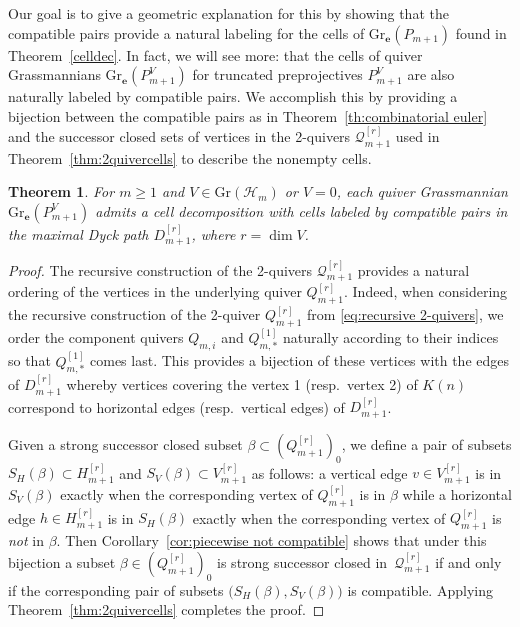 \documentclass{amsart}
\newtheorem{theorem}{Theorem}[section]
\numberwithin{equation}{section}
\newcommand{\bfe}{\mathbf{e}}
\newcommand{\cH}{\mathcal{H}}
\newcommand{\cQ}{\mathcal{Q}}
\newcommand{\Gr}{\mathrm{Gr}}
\begin{document}
Our goal is to give a geometric explanation for this by showing that the compatible pairs provide a natural labeling for the cells of $\Gr_\bfe(P_{m+1})$ found in Theorem~\ref{celldec}.
In fact, we will see more: that the cells of quiver Grassmannians $\Gr_\bfe(P_{m+1}^V)$ for truncated preprojectives $P_{m+1}^V$ are also naturally labeled by compatible pairs.
We accomplish this by providing a bijection between the compatible pairs as in Theorem~\ref{th:combinatorial euler} and the successor closed sets of vertices in the 2-quivers $\cQ_{m+1}^{[r]}$ used in Theorem~\ref{thm:2quivercells} to describe the nonempty cells.
\begin{theorem}
  \label{th:compatible cells}
  For $m\ge1$ and $V\in\Gr(\cH_m)$ or $V=0$, each quiver Grassmannian $\Gr_\bfe(P_{m+1}^V)$ admits a cell decomposition with cells labeled by compatible pairs in the maximal Dyck path $D_{m+1}^{[r]}$, where $r=\dim V$.
\end{theorem}
\begin{proof}
  The recursive construction of the 2-quivers $\cQ_{m+1}^{[r]}$ provides a natural ordering of the vertices in the underlying quiver $Q_{m+1}^{[r]}$.
  Indeed, when considering the recursive construction of the 2-quiver $Q_{m+1}^{[r]}$ from \eqref{eq:recursive 2-quivers}, we order the component quivers $Q_{m,i}$ and $Q_{m,*}^{[1]}$ naturally according to their indices so that $Q_{m,*}^{[1]}$ comes last.
  This provides a bijection of these vertices with the edges of $D_{m+1}^{[r]}$ whereby vertices covering the vertex 1 (resp.\ vertex 2) of $K(n)$ correspond to horizontal edges (resp.\ vertical edges) of $D_{m+1}^{[r]}$.

  Given a strong successor closed subset $\beta\subset(Q_{m+1}^{[r]})_0$, we define a pair of subsets $S_H(\beta)\subset H_{m+1}^{[r]}$ and $S_V(\beta)\subset V_{m+1}^{[r]}$ as follows: a vertical edge $v\in V_{m+1}^{[r]}$ is in $S_V(\beta)$ exactly when the corresponding vertex of $Q_{m+1}^{[r]}$ is in $\beta$ while a horizontal edge $h\in H_{m+1}^{[r]}$ is in $S_H(\beta)$ exactly when the corresponding vertex of $Q_{m+1}^{[r]}$ is \emph{not} in $\beta$.
  Then Corollary~\ref{cor:piecewise not compatible} shows that under this bijection a subset $\beta\in(Q_{m+1}^{[r]})_0$ is strong successor closed in~$\cQ_{m+1}^{[r]}$ if and only if the corresponding pair of subsets $\big(S_H(\beta),S_V(\beta)\big)$ is compatible.
  Applying Theorem~\ref{thm:2quivercells} completes the proof.
\end{proof}
\end{document}
